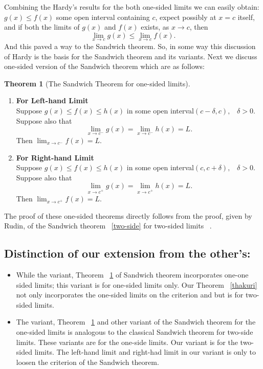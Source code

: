\documentclass[a4paper,twoside,12pt]{article}
\theoremstyle{plain}
\theoremstyle{definition}
\theoremstyle{theorem}
\newtheorem{thm}{Theorem}
\begin{document}
{Combining the Hardy's results for the both one-sided limits we can easily obtain: $g(x) \leq f(x)$ some open interval containing $c$, expect possibly at $x=c$ itself, and if both the limits of $g(x)$ and $f(x)$ exists, as $x \to c$, then $$\lim_{x \to c} g(x) \leq  \lim_{x \to c} f(x).$$ And this paved a way to the Sandwich theorem. So, in some way this discussion of Hardy is the basis for the Sandwich theorem and its variants. Next we discuss one-sided version of the Sandwich theorem which are as follows:

\begin{thm}[The Sandwich Theorem for one-sided limits] \cite{thomas}
  \label{one-side}
  \begin{enumerate}
  \item \textbf{For Left-hand Limit} \\[1mm]
    Suppose $g(x) \leq f(x) \leq h(x)$ in some open interval$(c-\delta, c), \;\;\; \delta > 0$. Suppose also that $$\lim_{x \to c^-} g(x) = \lim_{x \to c^-} h(x) =L  .$$ Then $\displaystyle \lim_{x \to c^-} f(x)=L$.

  \item \textbf{For Right-hand Limit} \\[1mm]
    Suppose $g(x) \leq f(x) \leq h(x)$ in some open interval$(c, c+\delta), \;\;\; \delta > 0$. Suppose also that $$\lim_{x \to c^+} g(x) = \lim_{x \to c^+} h(x) =L  .$$ Then $\displaystyle \lim_{x \to c^+} f(x)=L$.
  \end{enumerate}

\end{thm}
The proof of these one-sided theorems directly follows from the proof, given by Rudin, of the Sandwich theorem ~\ref{two-side} for two-sided limits ~\cite{rudin}.

\subsection{Distinction of our extension from the other's:}
\begin{itemize}
\item While the variant, Theorem ~\ref{one-side} of Sandwich theorem incorporates one-one sided limits; this variant is for one-sided limits only. Our Theorem ~\ref{thakuri} not only incorporates the one-sided limits on the criterion and but is for two-sided limits.

\item The variant, Theorem ~\ref{one-side} and other variant of the Sandwich theorem for the one-sided limits is analogous to the classical Sandwich theorem for two-side limits. These variants are for the one-side limits. Our variant is for the two-sided limits. The left-hand limit and right-had limit in our variant is only to loosen the criterion of the Sandwich theorem.
\end{itemize}

}
\end{document}
